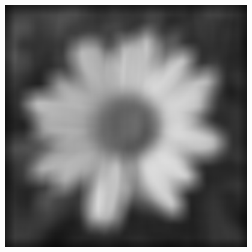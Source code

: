 \documentclass[a4paper]{report}
\begin{document}
\begin{figure}[H]
\begin{minipage}{.3\textwidth}
\end{minipage}%
\begin{minipage}{.3\textwidth}
  \centering
  \includegraphics[width=0.95\textwidth]{images/Smooth/spatial-gaussian/flower_smooth_spatial_average_20_0.8.png}
\end{minipage}
\end{figure}
\end{document}
